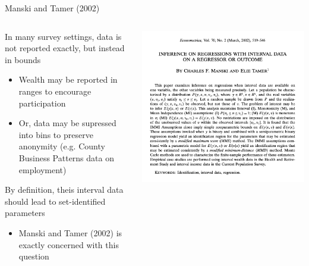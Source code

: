 \documentclass[notes,11pt, aspectratio=169]{beamer}
\newenvironment{wideitemize}{\itemize\addtolength{\itemsep}{10pt}}{\enditemize}
\begin{document}
\begin{frame}{Manski and Tamer (2002)}
      \begin{columns}[onlytextwidth, T] %
        \begin{column}{.5\textwidth}
          \begin{wideitemize}
          \item In many survey settings, data is not reported exactly, but instead in bounds
            \begin{itemize}
            \item Wealth may be reported in ranges to encourage participation
            \item Or, data may be supressed into bins to preserve
              anonymity (e.g. County Business Patterns data on
              employment)
            \end{itemize}
          \item By definition, theis interval data should lead to
            set-identified parameters
            \begin{itemize}
            \item Manski and Tamer (2002) is exactly concerned with this question
            \end{itemize}
          \end{wideitemize}
      \end{column}%
      \hfill%
      \begin{column}{.5\textwidth}
        \includegraphics[width=\linewidth]{images/manski_tamer_1.png}
      \end{column}%
    \end{columns}
\end{frame}
\end{document}
